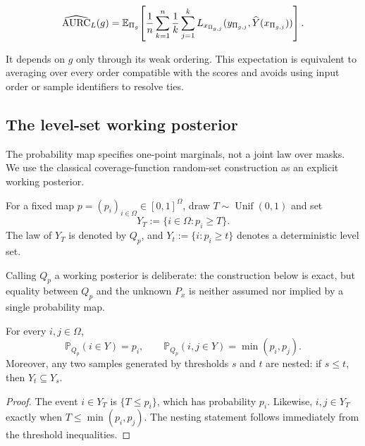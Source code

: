 \begin{equation*}
  \widehat{\operatorname{AURC}}_L(g)
  =\mathbb{E}_{\Pi_g}\!\left[
    \frac1n\sum_{k=1}^n
      \frac1k\sum_{j=1}^k
      L_{x_{\Pi_{g,j}}}(y_{\Pi_{g,j}},
                        \widehat Y(x_{\Pi_{g,j}}))
    \right].
\end{equation*}

It depends on $g$ only through its weak ordering. This expectation is
equivalent to averaging over every order compatible with the scores and avoids
using input order or sample identifiers to resolve ties.

\subsection{The level-set working posterior}

The probability map specifies one-point marginals, not a joint law over
masks.  We use the classical coverage-function random-set construction
\cite{goodman,molchanov} as an explicit working posterior.

\begin{definition}
\label{app:def:levelset-posterior}
For a fixed map $p=(p_i)_{i\in\Omega}\in[0,1]^\Omega$, draw
$T\sim\operatorname{Unif}(0,1)$ and set
\begin{equation*}
  Y_T:=\{i\in\Omega:p_i\geq T\}.
\end{equation*}
The law of $Y_T$ is denoted by $Q_p$, and
$Y_t:=\{i:p_i\geq t\}$ denotes a deterministic level set.
\end{definition}

Calling $Q_p$ a working posterior is deliberate: the construction below
is exact, but equality between $Q_p$ and the unknown $P_x$ is neither
assumed nor implied by a single probability map.

\begin{proposition}
\label{app:prop:levelset-properties}
For every $i,j\in\Omega$,
\begin{equation*}
  \mathbb{P}_{Q_p}(i\in Y)=p_i,
  \qquad
  \mathbb{P}_{Q_p}(i,j\in Y)=\min(p_i,p_j).
\end{equation*}
Moreover, any two samples generated by thresholds $s$ and $t$ are
nested: if $s\leq t$, then $Y_t\subseteq Y_s$.
\end{proposition}

\begin{proof}
The event $i\in Y_T$ is $\{T\leq p_i\}$, which has probability $p_i$.
Likewise, $i,j\in Y_T$ exactly when
$T\leq\min(p_i,p_j)$.  The nesting statement follows immediately from
the threshold inequalities.
\end{proof}

